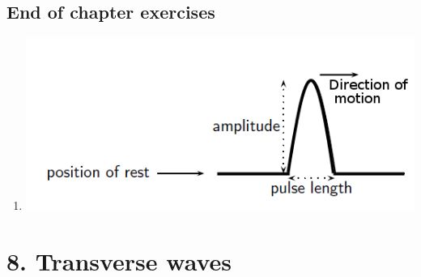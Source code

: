 \begin{multicols}{4}
\begin{enumerate}[noitemsep, label=\textbf{\arabic*}.]
 \end{enumerate}
\end{multicols}

\subsection{End of chapter exercises} 

\begin{enumerate}[noitemsep, label=\textbf{\arabic*}. ] 
\item %
\includegraphics[width=.4\textwidth]{photos/transverse_pulses_eocex.png}
\end{enumerate}

\section {8. Transverse waves}
